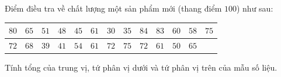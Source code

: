 \begin{ex}
Điểm điều tra về chất lượng một sản phẩm mới (thang điểm $100$) như sau:
\begin{center}
\begin{tabular}{|c|c|c|c|c|c|c|c|c|c|c|c|c|}\hline
$80$ & $65$ & $51$ & $48$ & $45$ & $61$ & $30$ & $35$ & $84$ & $83$ & $60$ & $58$ & $75$\\\hline
$72$ & $68$ & $39$ & $41$ & $54$ & $61$ & $72$ & $75$ & $72$ & $61$ & $50$ & $65$ & \\\hline
\end{tabular}
\end{center}
Tính tổng của trung vị, tứ phân vị dưới và tứ phân vị trên của mẫu số liệu.
\end{ex}
